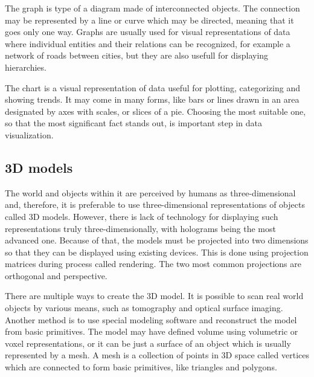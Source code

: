 The graph is type of a diagram made of interconnected objects. The connection
may be represented by a line or curve which may be directed, meaning that it
goes only one way. Graphs are usually used for visual representations of data
where individual entities and their relations can be recognized, for example a
network of roads between cities, but they are also usefull for displaying
hierarchies.

The chart is a visual representation of data useful for plotting, categorizing
and showing trends. It may come in many forms, like bars or lines drawn in an
area designated by axes with scales, or slices of a pie. Choosing the most
suitable one, so that the most significant fact stands out, is important step in
data visualization.

\subsection{3D models}
The world and objects within it are perceived by humans as three-dimensional
and, therefore, it is preferable to use three-dimensional representations of
objects called 3D models. However, there is lack of technology for displaying
such representations truly three-dimensionally, with holograms being the most
advanced one. Because of that, the models must be projected into two dimensions
so that they can be displayed using existing devices. This is done using
projection matrices during process called rendering. The two most common
projections are orthogonal and perspective.

There are multiple ways to create the 3D model. It is possible to scan real
world objects by various means, such as tomography and optical surface imaging.
Another method is to use special modeling software and reconstruct the model from basic
primitives. The model may have defined volume using volumetric or voxel
representations, or it can be just a surface of an object which is usually
represented by a mesh. A mesh is a collection of points in 3D space called vertices
which are connected to form basic primitives, like triangles and polygons.

